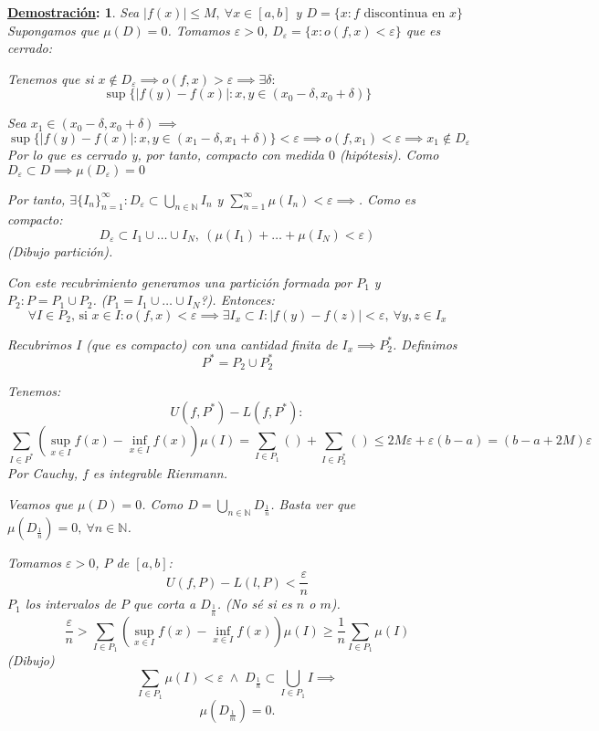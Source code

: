 \documentclass[10pt,a4paper,openright]{book}
\theoremstyle{break}
\newtheorem*{demo}{\underline{Demostración}:}
\begin{document}
\begin{demo}
Sea $\vert f\left(x\right)\vert \le M,\ \forall x \in \left[a, b\right]$ y $D = \{x: f \text{ discontinua en } x\}$
Supongamos que $\mu\left(D\right) = 0$. Tomamos $\varepsilon > 0$, $D_{\varepsilon} = \{x: o\left(f, x\right) < \varepsilon\}$ que es cerrado:

Tenemos que si $x \not\in D_{\varepsilon} \implies o\left(f, x\right) > \varepsilon \implies \exists \delta:$
$$\sup \{ \vert f\left(y\right) - f\left(x\right) \vert: x, y \in \left(x_0 - \delta, x_0 + \delta \right) \}$$

Sea $x_1 \in \left(x_0 - \delta, x_0 + \delta \right) \implies$
$$\sup \{ \vert f\left(y\right) - f\left(x\right) \vert : x, y \in \left(x_1 - \delta, x_1 + \delta \right) \} < \varepsilon \implies o\left(f, x_1\right) < \varepsilon \implies x_1 \not\in D_{\varepsilon}$$
Por lo que es cerrado y, por tanto, compacto con medida $0$ (hipótesis).
Como $D_{\varepsilon} \subset D \implies \mu\left( D_{\varepsilon} \right) = 0$

Por tanto, $\exists \{I_n\}_{n=1}^{\infty}: D_{\varepsilon} \subset \bigcup_{n \in \mathbb{N}} I_n$ y $\sum_{n=1}^{\infty} \mu\left(I_n\right) < \varepsilon \implies$. Como es compacto:
$$D_{\varepsilon} \subset I_1 \cup \ldots \cup I_N,\ \left( \mu\left(I_1\right) + \ldots + \mu\left(I_N\right) < \varepsilon \right)$$
\textit{(Dibujo partición)}. 

Con este recubrimiento generamos una partición formada por $P_1$ y $P_2: P = P_1 \cup P_2$. ($P_1 = I_1 \cup \ldots \cup I_N$?). Entonces:
$$\forall I \in P_2 \text{, si } x \in I: o\left(f, x\right) < \varepsilon \implies \exists I_x \subset I: \vert f\left(y\right) - f\left(z\right) \vert < \varepsilon,\ \forall y, z \in I_x$$

Recubrimos $I$ (que es compacto) con una cantidad finita de $I_x \implies P_2^*$. Definimos 
$$P^* = P_2 \cup P_2^*$$

Tenemos:
$$U\left(f, P^* \right) - L\left(f, P^*\right) :$$
$$\sum_{I\in P^*} \left(\sup_{x \in I} f \left(x\right) - \inf_{x \in I} f\left(x\right) \right) \mu\left(I\right) = \sum_{I \in P_1} \left( \right) + \sum_{I \in P_2^*} \left( \right) \le 2M\varepsilon + \varepsilon\left(b - a\right) = \left(b - a + 2M\right) \varepsilon$$
Por Cauchy, $f$ es integrable Rienmann.

Veamos que $\mu\left(D\right) = 0$. Como $D = \bigcup_{n \in \mathbb{N}} D_{\frac{1}{n}}$. Basta ver que $\mu\left(D_{\frac{1}{n}}\right) = 0,\ \forall n \in \mathbb{N}$.

Tomamos $\varepsilon > 0$, $P$ de $\left[a, b\right]$:
$$U\left(f, P\right) - L\left(l, P\right) < \frac{\varepsilon}{n}$$
$P_1$ los intervalos de $P$ que corta a $D_{\frac{1}{n}}$. (No sé si es $n$ o $m$).
$$\frac{\varepsilon}{n} > \sum_{I \in P_1} \left(\sup_{x \in I} f\left(x\right) - \inf_{x \in I} f\left(x\right) \right) \mu\left(I\right) \ge \frac{1}{n} \sum_{I \in P_1} \mu\left(I\right)$$
(\textit{Dibujo}) 
$$\sum_{I \in P_1} \mu\left(I\right) < \varepsilon \; \land \; D_{\frac{1}{n}} \subset \bigcup_{I \in P_1} I \implies$$
$$\mu\left(D_{\frac{1}{m}}\right) = 0.$$
\end{demo}
\end{document}
